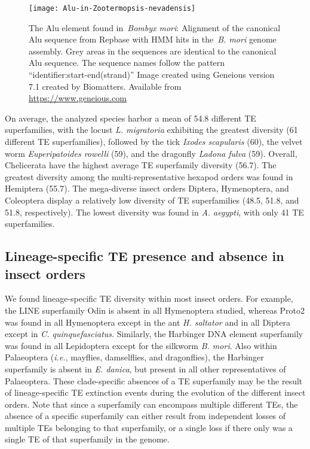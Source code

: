 \begin{figure}[h!]
\begin{center}
\texttt{[image: Alu-in-Zootermopsis-nevadensis]}
\caption[The Alu element found in the \emph{Bombyx mori} genome]{{The Alu element found in~\emph{Bombyx mori}: Alignment of the canonical
Alu sequence from Repbase with HMM hits in the~\emph{B. mori} genome
assembly. Grey areas in the sequences are identical to the canonical Alu
sequence. The sequence names follow the pattern
``identifier:start-end(strand)'' Image created using Geneious version
7.1 created by Biomatters. Available
from \url{https://www.geneious.com}
{\label{fig:alu-alignment}}%
}}
\end{center}
\end{figure}

On average, the analyzed species harbor a mean of 54.8 different TE
superfamilies, with the locust \emph{L. migratoria} exhibiting the
greatest diversity (61 different TE superfamilies), followed by the tick
\emph{Ixodes scapularis} (60), the velvet worm \emph{Euperipatoides
rowelli} (59), and the dragonfly \emph{Ladona fulva} (59). Overall,
Chelicerata have the highest average TE superfamily diversity (56.7).
The greatest diversity among the multi-representative hexapod orders was
found in Hemiptera (55.7). The mega-diverse insect orders Diptera,
Hymenoptera, and Coleoptera display a relatively low diversity of TE
superfamilies (48.5, 51.8, and 51.8, respectively). The lowest diversity
was found in \emph{A. aegypti}, with only 41 TE superfamilies.

\subsection{Lineage-specific TE presence and absence in insect
orders}

We found lineage-specific TE diversity within most insect orders. For
example, the LINE superfamily Odin is absent in all Hymenoptera studied,
whereas Proto2 was found in all Hymenoptera except in the ant \emph{H.
saltator} and in all Diptera except in \emph{C. quinquefasciatus}.
Similarly, the Harbinger DNA element superfamily was found in all
Lepidoptera except for the silkworm \emph{B. mori}. Also within
Palaeoptera (\emph{i.e.}, mayflies, damselflies, and dragonflies), the
Harbinger superfamily is absent in \emph{E. danica}, but present in all
other representatives of Palaeoptera. These clade-specific absences of a
TE superfamily may be the result of lineage-specific TE extinction
events during the evolution of the different insect orders. Note that
since a superfamily can encompass multiple different TEs, the absence of
a specific superfamily can either result from independent losses of
multiple TEs belonging to that superfamily, or a single loss if there
only was a single TE of that superfamily in the genome.

